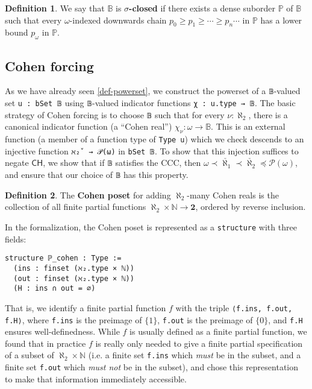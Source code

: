 \documentclass[sigplan,10pt,review, anonymous]{acmart}
\newcommand{\B}{\mathbb{B}}
\newcommand{\lil}{\lstinline}
\newcommand{\CH}{\mathsf{CH}}
\theoremstyle{definition}
\newtheorem{defn}{Definition}[section]
\begin{document}
\begin{defn}\label{def-sigma-closed}
We say that \(\B\) is \textbf{\(\sigma\)-closed} if there exists a dense suborder \(\mathbb{P}\) of \(\B\) such that every \(\omega\)-indexed downwards chain \(p_0 \geq p_1 \geq \cdots \geq p_n \cdots\) in \(\mathbb{P}\) has a lower bound \(p_{\omega}\) in \(\mathbb{P}\).
\end{defn}

\subsection{Cohen forcing}

As we have already seen \ref{def-powerset}, we construct the powerset of a \lil{𝔹}-valued set \lstinline{u : bSet 𝔹} using \lil{𝔹}-valued indicator functions \lil{χ : u.type → 𝔹}. The basic strategy of Cohen forcing is to choose \lil{𝔹} such that for every \(\nu : \aleph_2\), there is a canonical indicator function (a ``Cohen real'') \(\chi_{\nu} : \omega \to \mathbb{B}\). This is an external function (a member of a function type of \lstinline{Type u}) which we check descends to an injective function \lil{ℵ₂̌  → 𝒫(ω)} in \lil{bSet 𝔹}. To show that this injection suffices to negate \(\CH\), we show that if \lil{𝔹} satisfies the CCC, then \(\omega \prec \check{\aleph_1} \prec \check{\aleph_2} \preceq \mathcal{P}(\omega)\), and ensure that our choice of \lil{𝔹} has this property.

\begin{defn}
  The \textbf{Cohen poset} for adding $\aleph_2$-many Cohen reals is the collection of all finite partial functions $\aleph_2 \times \mathbb{N} \to \mathbf{2}$, ordered by reverse inclusion.
\end{defn}

In the formalization, the Cohen poset is represented as a \lstinline{structure} with three fields:
\begin{lstlisting}
structure ℙ_cohen : Type :=
  (ins : finset (ℵ₂.type × ℕ))
  (out : finset (ℵ₂.type × ℕ))
  (H : ins ∩ out = ∅)
\end{lstlisting}

That is, we identify a finite partial function $f$ with the triple \lil{⟨f.ins, f.out, f.H⟩}, where \lil{f.ins} is the preimage of $\{1\}$, \lil{f.out} is the preimage of $\{0\}$, and \lil{f.H} ensures well-definedness. While $f$ is usually defined as a finite partial function, we found that in practice $f$ is really only needed to give a finite partial specification of a subset of $\aleph_2 \times \mathbb{N}$ (i.e. a finite set \lil{f.ins} which \emph{must} be in the subset, and a finite set \lil{f.out} which \emph{must not} be in the subset), and chose this representation to make that information immediately accessible.
\end{document}
